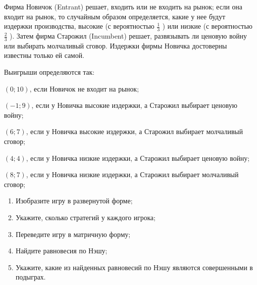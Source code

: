 \begin{problem}
Фирма Новичок (Entrant) решает, входить или не входить на рынок; если она входит на рынок, то случайным образом определяется, какие у нее будут издержки производства, высокие (с вероятностью  $\frac{1}{3} $ ) или низкие (с вероятностью  $\frac{2}{3} $ ). Затем фирма Старожил (Incumbent) решает, развязывать ли ценовую войну или выбирать молчаливый сговор. Издержки фирмы Новичка достоверны известны только ей самой.\par
Выигрыши определяются так:\par
$\displaystyle \left(0;10\right)$, если Новичок не входит на рынок;\par
$\displaystyle \left(-1;9\right)$, если у Новичка высокие издержки, а Старожил выбирает ценовую войну;\par
$\displaystyle \left(6;7\right)$, если у Новичка высокие издержки, а Старожил выбирает молчаливый сговор;\par
$\displaystyle \left(4;4\right)$, если у Новичка низкие издержки, а Старожил выбирает ценовую войну;\par
$\displaystyle \left(8;7\right)$, если у Новичка низкие издержки, а Старожил выбирает молчаливый сговор;\par
\begin{enumerate}
\item Изобразите игру в развернутой форме;\par
\item Укажите, сколько стратегий у каждого игрока;\par
\item  Переведите игру в матричную форму;\par
\item Найдите равновесия по Нэшу;\par
\item Укажите, какие из найденных равновесий по Нэшу являются совершенными в подыграх.\par
\end{enumerate}


\begin{sol}

\end{sol}
\end{problem}



